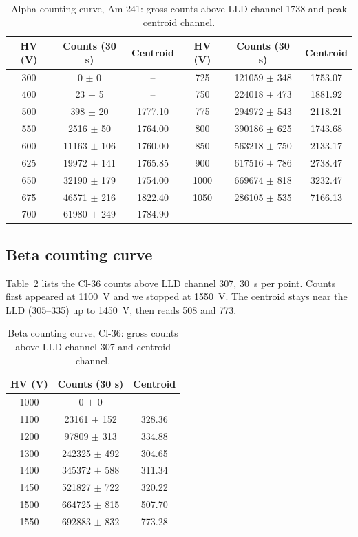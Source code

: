 \documentclass[12pt]{article}
\begin{document}
\begin{table}[!htbp]
\centering\small\setlength{\tabcolsep}{3pt}
\begin{tabular}{ccc|ccc}
\toprule
\textbf{HV (V)} & \textbf{Counts (30 s)} & \textbf{Centroid} & \textbf{HV (V)} & \textbf{Counts (30 s)} & \textbf{Centroid} \\
\midrule
300 & 0 $\pm$ 0 & -- & 725 & 121059 $\pm$ 348 & 1753.07 \\
400 & 23 $\pm$ 5 & -- & 750 & 224018 $\pm$ 473 & 1881.92 \\
500 & 398 $\pm$ 20 & 1777.10 & 775 & 294972 $\pm$ 543 & 2118.21 \\
550 & 2516 $\pm$ 50 & 1764.00 & 800 & 390186 $\pm$ 625 & 1743.68 \\
600 & 11163 $\pm$ 106 & 1760.00 & 850 & 563218 $\pm$ 750 & 2133.17 \\
625 & 19972 $\pm$ 141 & 1765.85 & 900 & 617516 $\pm$ 786 & 2738.47 \\
650 & 32190 $\pm$ 179 & 1754.00 & 1000 & 669674 $\pm$ 818 & 3232.47 \\
675 & 46571 $\pm$ 216 & 1822.40 & 1050 & 286105 $\pm$ 535 & 7166.13 \\
700 & 61980 $\pm$ 249 & 1784.90 & & & \\
\bottomrule
\end{tabular}
\caption{Alpha counting curve, Am-241: gross counts above LLD channel 1738 and peak centroid channel.}
\label{tab:rawalpha}
\end{table}

\subsection{Beta counting curve}

Table~\ref{tab:rawbeta} lists the Cl-36 counts above LLD channel 307, 30~s per point. Counts first appeared at 1100~V and we stopped at 1550~V. The centroid stays near the LLD (305--335) up to 1450~V, then reads 508 and 773.

\begin{table}[!htbp]
\centering\small
\begin{tabular}{ccc}
\toprule
\textbf{HV (V)} & \textbf{Counts (30 s)} & \textbf{Centroid} \\
\midrule
1000 & 0 $\pm$ 0 & -- \\
1100 & 23161 $\pm$ 152 & 328.36 \\
1200 & 97809 $\pm$ 313 & 334.88 \\
1300 & 242325 $\pm$ 492 & 304.65 \\
1400 & 345372 $\pm$ 588 & 311.34 \\
1450 & 521827 $\pm$ 722 & 320.22 \\
1500 & 664725 $\pm$ 815 & 507.70 \\
1550 & 692883 $\pm$ 832 & 773.28 \\
\bottomrule
\end{tabular}
\caption{Beta counting curve, Cl-36: gross counts above LLD channel 307 and centroid channel.}
\label{tab:rawbeta}
\end{table}
\end{document}
